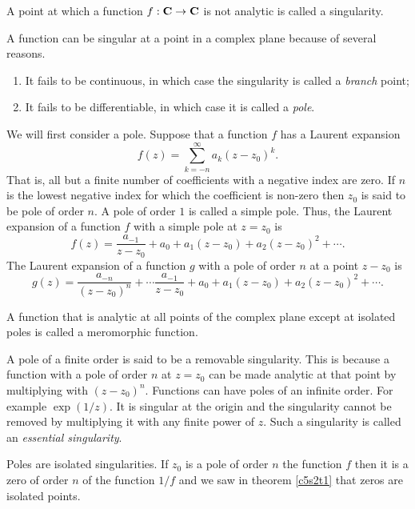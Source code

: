 \begin{defn}\label{c5s2d2}
A point at which a function $f: \mathbf{C} \rightarrow \mathbf{C}$ is not analytic is 
called a singularity.
\end{defn}

A function can be singular at a point in a complex plane because of several
reasons.
\begin{enumerate}
\item It fails to be continuous, in which case the singularity is called a 
\emph{branch} point;
\item It fails to be differentiable, in which case it is called a \emph{pole}.
\end{enumerate}

We will first consider a pole. Suppose that a function $f$ has a Laurent
expansion
\[
f(z) = \sum_{k=-n}^\infty a_k (z - z_0)^k.
\]
That is, all but a finite number of coefficients with a negative index are zero.
If $n$ is the lowest negative index for which the coefficient is non-zero then
$z_0$ is said to be pole of order $n$. A pole of order $1$ is called a simple
pole. Thus, the Laurent expansion of a function $f$ with a simple pole at 
$z = z_0$ is
\[
f(z) = \frac{a_{-1}}{z - z_0} + a_0 + a_1(z - z_0) + a_2(z - z_0)^2 + \cdots.
\]
The Laurent expansion of a function $g$ with a pole of order $n$ at a point
$z - z_0$ is
\[
g(z) = \frac{a_{-n}}{(z - z_0)^n} + \cdots \frac{a_{-1}}{z - z_0} + a_0 + 
a_1(z - z_0) + a_2(z - z_0)^2 + \cdots.
\]

\begin{defn}\label{c5s2d3}
A function that is analytic at all points of the complex plane except at 
isolated poles is called a meromorphic function.
\end{defn}

A pole of a finite order is said to be a removable singularity. This is because
a function with a pole of order $n$ at $z = z_0$ can be made analytic at that
point by multiplying with $(z - z_0)^n$. Functions can have poles of an infinite
order. For example $\exp(1/z)$. It is singular at the origin and the singularity
cannot be removed by multiplying it with any finite power of $z$. Such a 
singularity is called an \emph{essential singularity}.

Poles are isolated singularities. If $z_0$ is a pole of order $n$ the function 
$f$ then it is a zero of order $n$ of the function $1/f$ and we saw in theorem
\ref{c5s2t1} that zeros are isolated points.

